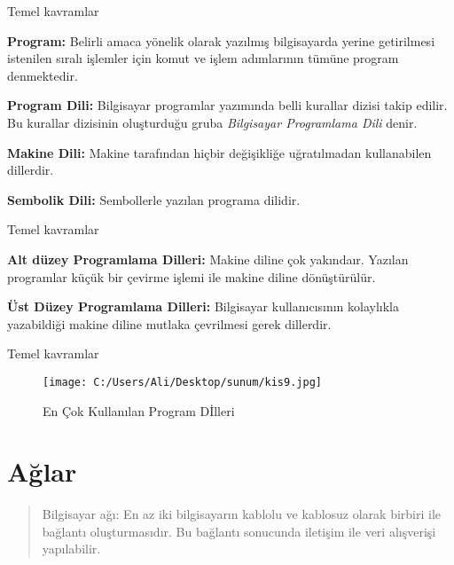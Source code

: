 \documentclass[
  12pt,
  ignorenonframetext,
]{beamer}
\begin{document}
\begin{frame}{Temel kavramlar}
\protect\hypertarget{temel-kavramlar-2}{}

\justify

\textbf{Program:} Belirli amaca yönelik olarak yazılmış bilgisayarda
yerine getirilmesi istenilen sıralı işlemler için komut ve işlem
adımlarının tümüne program denmektedir.

\textbf{Program Dili:} Bilgisayar programlar yazımında belli kurallar
dizisi takip edilir. Bu kurallar dizisinin oluşturduğu gruba
\emph{Bilgisayar Programlama Dili} denir.

\textbf{Makine Dili:} Makine tarafından hiçbir değişikliğe uğratılmadan
kullanabilen dillerdir.

\textbf{Sembolik Dili:} Sembollerle yazılan programa dilidir.

\end{frame}

\begin{frame}{Temel kavramlar}
\protect\hypertarget{temel-kavramlar-3}{}

\justify

\textbf{Alt düzey Programlama Dilleri:} Makine diline çok yakındaır.
Yazılan programlar küçük bir çevirme işlemi ile makine diline
dönüştürülür.

\textbf{Üst Düzey Programlama Dilleri:} Bilgisayar kullanıcısının
kolaylıkla yazabildiği makine diline mutlaka çevrilmesi gerek dillerdir.

\end{frame}

\begin{frame}{Temel kavramlar}
\protect\hypertarget{temel-kavramlar-4}{}

\begin{figure}
\centering
\texttt{[image: C:/Users/Ali/Desktop/sunum/kis9.jpg]}
\caption{En Çok Kullanılan Program Dİlleri}
\end{figure}

\end{frame}

\hypertarget{aux11flar}{%
\section{Ağlar}\label{aux11flar}}

\begin{quote}
Bilgisayar ağı: En az iki bilgisayarın kablolu ve kablosuz olarak
birbiri ile bağlantı oluşturmasıdır. Bu bağlantı sonucunda iletişim ile
veri alışverişi yapılabilir.
\end{quote}
\end{document}
